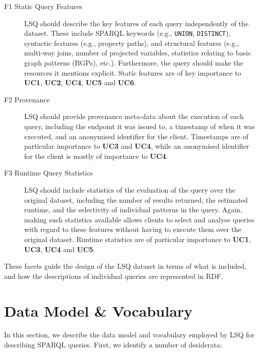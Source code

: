 \begin{description}
\item[F1 Static Query Features] LSQ should describe the key features of each query independently of the dataset. These include  SPARQL keywords (e.g., \texttt{UNION}, \texttt{DISTINCT}), syntactic features (e.g., property paths), and structural features (e.g., multi-way joins, number of projected variables, statistics relating to basic graph patterns (BGPs), etc.). Furthermore, the query should make the resources it mentions explicit. Static features are of key importance to \textbf{UC1}, \textbf{UC2}, \textbf{UC4}, \textbf{UC5} and \textbf{UC6}. 
\item[F2 Provenance] LSQ should provide provenance meta-data about the execution of each query, including the endpoint it was issued to, a timestamp of when it was executed, and an anonymised identifier for the client. Timestamps are of particular importance to \textbf{UC3} and \textbf{UC4}, while an anonymised identifier for the client is mostly of importance to \textbf{UC4}.
\item[F3 Runtime Query Statistics] LSQ should include statistics of the evaluation of the query over the original dataset, including the number of results returned, the estimated runtime, and the selectivity of individual patterns in the query. Again, making such statistics available allows clients to select and analyse queries with regard to these features without having to execute them over the original dataset. Runtime statistics are of particular importance to \textbf{UC1}, \textbf{UC3}, \textbf{UC4} and \textbf{UC5}. 
\end{description}

These facets guide the design of the LSQ dataset in terms of what is included, and how the descriptions of individual queries are represented in RDF.

\section{Data Model \& Vocabulary}\label{sec:model}
\label{sec:linkedsql}

In this section, we describe the data model and vocabulary employed by LSQ for describing SPARQL queries. First, we identify a number of desiderata:

